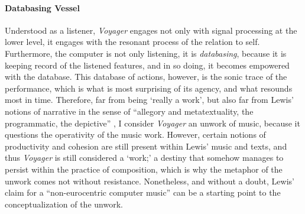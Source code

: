 \paragraph{Databasing Vessel}
Understood as a listener, \textit{Voyager} engages not only with signal processing at the lower level, it engages with the resonant process of the relation to self. Furthermore, the computer is not only listening, it is \textit{databasing}, because it is keeping record of the listened features, and in so doing, it becomes empowered with the database. This database of actions, however, is the sonic trace of the performance, which is what is most surprising of its agency, and what resounds most in time. Therefore, far from being `really a work', but also far from Lewis' notions of narrative in the sense of ``allegory and metatextuality, the programmatic, the depictive'' \parencite[110]{Lew99:Int}, I consider \textit{Voyager} an unwork of music, because it questions the operativity of the music work. However, certain notions of productivity and cohesion are still present within Lewis' music and texts, and thus \textit{Voyager} is still considered a `work;' a destiny that somehow manages to persist within the practice of composition, which is why the metaphor of the unwork comes not without resistance. Nonetheless, and without a doubt, Lewis' claim for a ``non-eurocentric computer music'' \parencite[107]{Lew99:Int} can be a starting point to the conceptualization of the unwork.

